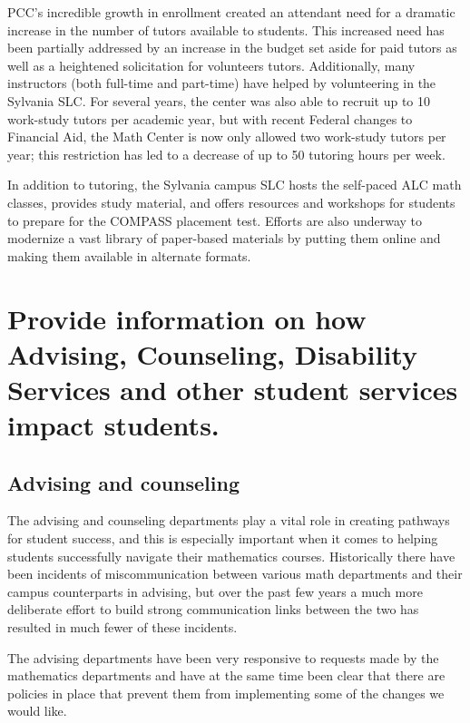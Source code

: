 PCC's incredible growth in enrollment created an attendant need for a dramatic increase in the number of tutors available to students. This increased need has been partially addressed by an increase in the budget set aside for paid tutors as well as a heightened solicitation for volunteers tutors. Additionally, many instructors (both full-time and part-time) have helped by volunteering in the Sylvania SLC. For several years, the center was also able to recruit up to 10 work-study tutors per academic year, but with recent Federal changes to Financial Aid, the Math Center is now only allowed two work-study tutors per year; this restriction has led to a decrease of up to 50 tutoring hours per week.

In addition to tutoring, the Sylvania campus SLC hosts the self-paced ALC math classes, provides study material, and offers resources and workshops for students to prepare for the COMPASS placement test. Efforts are also underway to modernize a vast library of paper-based materials by putting them online and making them available in alternate formats.

\section{Provide information on how Advising, Counseling, Disability Services and other student services impact students. }
\subsection{Advising and counseling}
The advising and counseling departments play a vital role in creating pathways for student success, and this is especially important when it comes to helping students successfully navigate their mathematics courses.  Historically there have been incidents of miscommunication between various math departments and their campus counterparts in advising, but over the past few years a much more deliberate effort to build strong communication links  between the two has resulted in much fewer of these incidents.

The advising departments have been very responsive to requests made by the mathematics departments and have at the same time been clear that there are policies in place that prevent them from implementing some of the changes we would like.  

